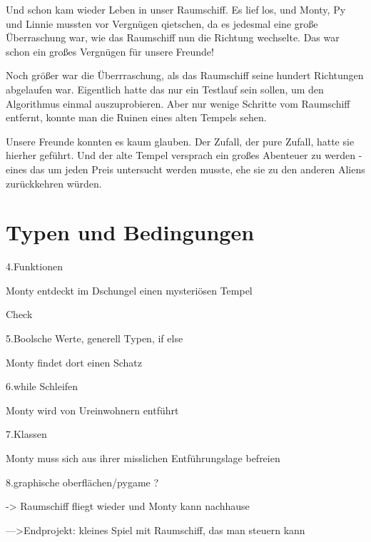 \documentclass[a5paper,12pt,twoside,openright]{scrbook}
\begin{document}
Und schon kam wieder Leben in unser Raumschiff.
Es lief los, und Monty, Py und Linnie mussten vor Vergnügen qietschen, da es jedesmal eine große Überraschung war, 
wie das Raumschiff nun die Richtung wechselte.
Das war schon ein großes Vergnügen für unsere Freunde!

Noch größer war die Überrraschung, als das Raumschiff seine hundert Richtungen abgelaufen war.
Eigentlich hatte das nur ein Testlauf sein sollen, um den Algorithmus einmal auszuprobieren.
Aber nur wenige Schritte vom Raumschiff entfernt, konnte man die Ruinen eines alten Tempels sehen.

Unsere Freunde konnten es kaum glauben.
Der Zufall, der pure Zufall, hatte sie hierher geführt.
Und der alte Tempel versprach ein großes Abenteuer zu werden - eines das um jeden Preis untersucht werden musste, ehe sie 
zu den anderen Aliens zurückkehren würden.

\chapter{Typen und Bedingungen}




\newpage


4.Funktionen   
    
Monty entdeckt im Dschungel einen mysteriösen Tempel     

Check
    
5.Boolsche Werte, generell Typen, if else

Monty findet dort einen Schatz

6.while Schleifen

Monty wird von Ureinwohnern entführt

7.Klassen

Monty muss sich aus ihrer misslichen Entführungslage befreien 

8.graphische oberflächen/pygame ?

-> Raumschiff fliegt wieder und Monty kann nachhause

--->Endprojekt: kleines Spiel mit Raumschiff, das man steuern kann




 
\end{document}
